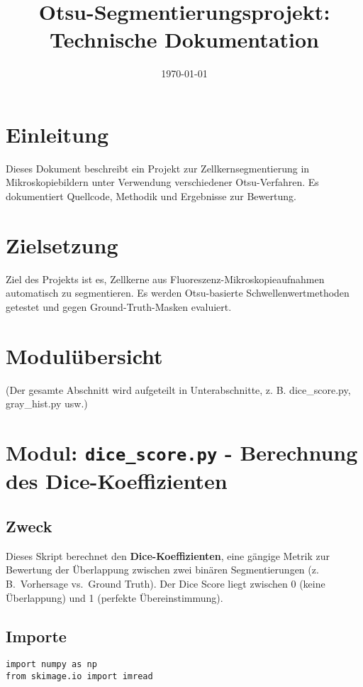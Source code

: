 \documentclass[a4paper,12pt]{article}
\title{Otsu-Segmentierungsprojekt: Technische Dokumentation}
\author{}
\date{\today}
\begin{document}
\maketitle

\tableofcontents

\newpage

\section{Einleitung}
Dieses Dokument beschreibt ein Projekt zur Zellkernsegmentierung in Mikroskopiebildern unter Verwendung verschiedener Otsu-Verfahren. Es dokumentiert Quellcode, Methodik und Ergebnisse zur Bewertung.

\newpage


\newpage

\section{Zielsetzung}
Ziel des Projekts ist es, Zellkerne aus Fluoreszenz-Mikroskopieaufnahmen automatisch zu segmentieren. Es werden Otsu-basierte Schwellenwertmethoden getestet und gegen Ground-Truth-Masken evaluiert.


\section{Modulübersicht}
(Der gesamte Abschnitt wird aufgeteilt in Unterabschnitte, z. B. 	{dice\_score.py}, 	{gray\_hist.py} usw.)

\section{Modul: \texttt{dice\_score.py} - Berechnung des Dice-Koeffizienten}

\subsection*{Zweck}
Dieses Skript berechnet den \textbf{Dice-Koeffizienten}, eine gängige Metrik zur Bewertung der Überlappung zwischen zwei binären Segmentierungen (z.\,B.\ Vorhersage vs.\ Ground Truth). Der Dice Score liegt zwischen 0 (keine Überlappung) und 1 (perfekte Übereinstimmung).

\subsection*{Importe}
\begin{verbatim}
import numpy as np
from skimage.io import imread
\end{verbatim}
\end{document}
